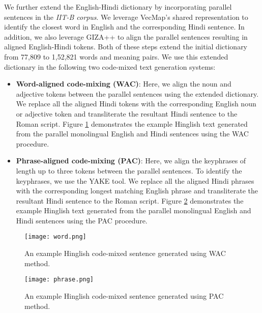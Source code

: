 \documentclass[11pt]{article}
\begin{document}
We further extend the English-Hindi dictionary by incorporating parallel sentences in the \textit{IIT-B corpus}. We leverage VecMap's shared representation to identify the closest word in English and the corresponding Hindi sentence. In addition, we also leverage GIZA++  to align the parallel sentences resulting in aligned English-Hindi tokens. Both of these steps extend the initial dictionary from 77,809 to 1,52,821 words and meaning pairs. We use this extended dictionary in the following two code-mixed text generation systems:
\begin{itemize}
    \item \textbf{Word-aligned code-mixing (WAC)}: Here, we align the noun and adjective tokens between the parallel sentences using the extended dictionary. We replace all the aligned Hindi tokens with the corresponding English noun or adjective token and transliterate the resultant Hindi sentence to the Roman script. Figure \ref{fig:example_wac} demonstrates the example Hinglish text generated from the parallel monolingual English and Hindi sentences using the WAC procedure.
    
    \item \textbf{Phrase-aligned code-mixing (PAC)}: Here, we align the keyphrases of length up to three tokens between the parallel sentences. To identify the keyphrases, we use the YAKE tool. We replace all the aligned Hindi phrases with the corresponding longest matching English phrase and transliterate the resultant Hindi sentence to the Roman script. Figure \ref{fig:example_pac} demonstrates the example Hinglish text generated from the parallel monolingual English and Hindi sentences using the PAC procedure. 
\end{itemize}


\begin{figure}[!tbh]
\centering
    \texttt{[image: word.png]}
\caption{An example Hinglish code-mixed sentence generated using WAC method.}
\label{fig:example_wac}
\end{figure}

\begin{figure}[!tbh]
\centering
    \texttt{[image: phrase.png]}
\caption{An example Hinglish code-mixed sentence generated using PAC method.}
\label{fig:example_pac}
\end{figure}
\end{document}
